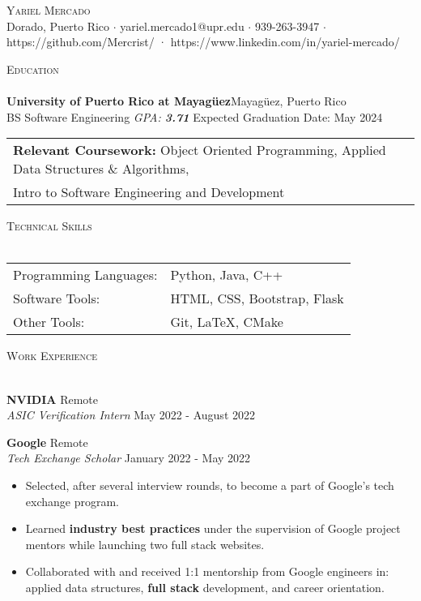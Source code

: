 \documentclass[a4paper]{article}
\newcommand{\lineunder} {
    \vspace*{-8pt} \\
    \hspace*{-18pt} \hrulefill \\
}
\newcommand{\header} [1] {
    {\hspace*{-18pt}\vspace*{6pt} \textsc{#1}}
    \vspace*{-6pt} \lineunder
}
\begin{document}
\vspace*{-40pt}

    

\vspace*{-10pt}
\begin{center}
	{\Huge \scshape {Yariel Mercado}}\\
	Dorado, Puerto Rico $\cdot$ yariel.mercado1@upr.edu $\cdot$ 939-263-3947 $\cdot$ https://github.com/Mercrist/ · https://www.linkedin.com/in/yariel-mercado/\\
\end{center}

\header{Education}
\textbf{University of Puerto Rico at Mayagüez}\hfill Mayagüez, Puerto Rico\\
BS Software Engineering \textit{GPA: \bf{3.71}} \hfill Expected Graduation Date: May 2024\\	

\vspace{2mm}
\begin{tabular}{ l l }
	\textbf{Relevant Coursework:} Object Oriented 	                    				Programming, Applied Data Structures \& Algorithms, \\ Intro to Software Engineering and Development 
\vspace{2mm}
\end{tabular}

\header{Technical Skills}
\begin{tabular}{ l l }
	Programming Languages:       & Python, Java, C++                \\
	Software Tools: & HTML, CSS, Bootstrap, Flask \\
	Other Tools:   & Git, \LaTeX{}, CMake  \\
	
\end{tabular}
\vspace{2mm}

\header{Work Experience}
\vspace{-1mm}

\textbf{NVIDIA} \hfill Remote\\
\textit{ASIC Verification Intern} \hfill May 2022 - August 2022\\
\vspace{2mm}

\textbf{Google} \hfill Remote\\
\textit{Tech Exchange Scholar} \hfill January 2022 - May 2022\\
\vspace{-2mm}
\begin{itemize} \itemsep -1pt
	\item Selected, after several interview rounds, to become a part of Google's tech exchange program. 
	\item Learned \textbf{industry best practices} under the supervision of Google project mentors while launching two full stack websites.
	\item Collaborated with and received 1:1 mentorship from Google engineers in: applied data structures, \textbf{full stack} development, and career orientation.
\end{itemize}
\end{document}
